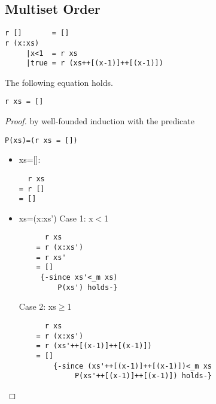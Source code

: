 \subsection{Multiset Order}
\begin{verbatim}
r []       = []
r (x:xs) 
     |x<1  = r xs
     |true = r (xs++[(x-1)]++[(x-1)])
\end{verbatim}
\begin{claim}The following equation holds.
\begin{verbatim}
r xs = []
\end{verbatim}
\end{claim}
\begin{proof} by well-founded induction with the predicate 
\begin{verbatim}
P(xs)=(r xs = [])
\end{verbatim}
\begin{itemize}
\item[] xs=[]:
\begin{verbatim}
  r xs
= r []
= []
\end{verbatim}
\item[] xs=(x:xs')
\subitem Case 1: x$<$1
\begin{verbatim}
	  r xs
	= r (x:xs')
	= r xs'
	= []
     {-since xs'<_m xs)
         P(xs') holds-}
\end{verbatim}
\subitem Case 2: xs$\geq$1
\begin{verbatim}
	  r xs
	= r (x:xs')
	= r (xs'++[(x-1)]++[(x-1)])
	= []
	    {-since (xs'++[(x-1)]++[(x-1)])<_m xs 
	         P(xs'++[(x-1)]++[(x-1)]) holds-}
\end{verbatim}
\end{itemize}
\end{proof}
